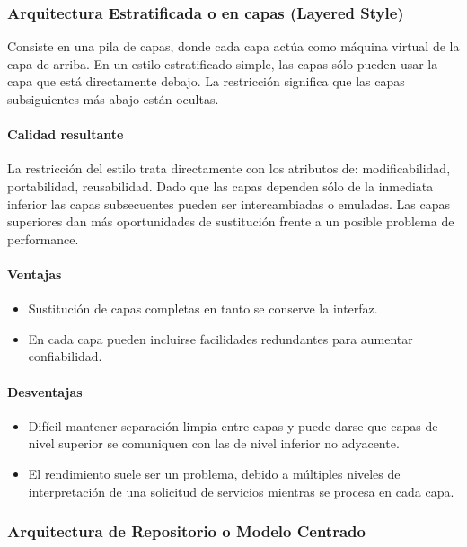 \subsubsection{Arquitectura Estratificada o en capas (Layered Style)}
Consiste en una pila de capas, donde cada capa actúa como máquina virtual de la capa de arriba. En un estilo estratificado simple, las capas sólo pueden usar la capa que está directamente debajo. La restricción significa que las capas subsiguientes más abajo están ocultas.
\paragraph{Calidad resultante}
La restricción del estilo trata directamente con los atributos de: modificabilidad, portabilidad, reusabilidad. Dado que las capas dependen sólo de la inmediata inferior las capas subsecuentes pueden ser intercambiadas o emuladas. Las capas superiores dan más oportunidades de sustitución frente a un posible problema de performance.
\paragraph{Ventajas}
\begin{itemize}
	\item Sustitución de capas completas en tanto se conserve la interfaz.
	\item En cada capa pueden incluirse facilidades redundantes para aumentar confiabilidad.
\end{itemize}
\paragraph{Desventajas}
\begin{itemize}
	\item Difícil mantener separación limpia entre capas y puede darse que capas de nivel superior se comuniquen con las de nivel inferior no adyacente.
	\item El rendimiento suele ser un problema, debido a múltiples niveles de interpretación de una solicitud de servicios mientras se procesa en cada capa.
\end{itemize}
\subsubsection{Arquitectura de Repositorio o Modelo Centrado}
